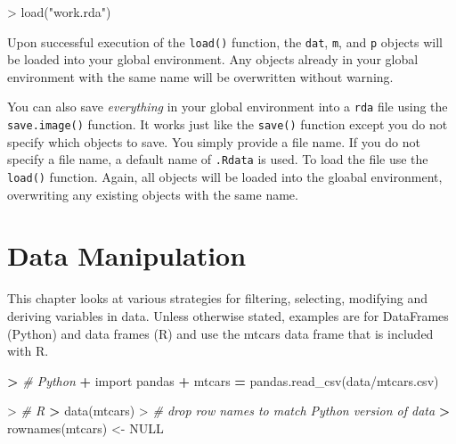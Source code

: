 \documentclass[
]{book}
\newenvironment{Shaded}{\begin{snugshade}}{\end{snugshade}}
\newcommand{\CommentTok}[1]{\textcolor[rgb]{0.56,0.35,0.01}{\textit{#1}}}
\newcommand{\ConstantTok}[1]{\textcolor[rgb]{0.00,0.00,0.00}{#1}}
\newcommand{\ErrorTok}[1]{\textcolor[rgb]{0.64,0.00,0.00}{\textbf{#1}}}
\newcommand{\FunctionTok}[1]{\textcolor[rgb]{0.00,0.00,0.00}{#1}}
\newcommand{\ImportTok}[1]{#1}
\newcommand{\NormalTok}[1]{#1}
\newcommand{\OperatorTok}[1]{\textcolor[rgb]{0.81,0.36,0.00}{\textbf{#1}}}
\newcommand{\OtherTok}[1]{\textcolor[rgb]{0.56,0.35,0.01}{#1}}
\newcommand{\SpecialCharTok}[1]{\textcolor[rgb]{0.00,0.00,0.00}{#1}}
\newcommand{\StringTok}[1]{\textcolor[rgb]{0.31,0.60,0.02}{#1}}
\begin{document}
\begin{Shaded}
\begin{Highlighting}[]
\SpecialCharTok{\textgreater{}} \FunctionTok{load}\NormalTok{(}\StringTok{"work.rda"}\NormalTok{)}
\end{Highlighting}
\end{Shaded}

Upon successful execution of the \texttt{load()} function, the \texttt{dat}, \texttt{m}, and \texttt{p} objects will be loaded into your global environment. Any objects already in your global environment with the same name will be overwritten without warning.

You can also save \emph{everything} in your global environment into a \texttt{rda} file using the \texttt{save.image()} function. It works just like the \texttt{save()} function except you do not specify which objects to save. You simply provide a file name. If you do not specify a file name, a default name of \texttt{.Rdata} is used. To load the file use the \texttt{load()} function. Again, all objects will be loaded into the gloabal environment, overwriting any existing objects with the same name.

\hypertarget{data-manipulation}{%
\chapter{Data Manipulation}\label{data-manipulation}}

This chapter looks at various strategies for filtering, selecting, modifying and deriving variables in data. Unless otherwise stated, examples are for DataFrames (Python) and data frames (R) and use the mtcars data frame that is included with R.

\begin{Shaded}
\begin{Highlighting}[]
\OperatorTok{\textgreater{}} \CommentTok{\# Python}
\OperatorTok{+} \ImportTok{import}\NormalTok{ pandas}
\OperatorTok{+}\NormalTok{ mtcars }\OperatorTok{=}\NormalTok{ pandas.read\_csv(}\StringTok{\textquotesingle{}data/mtcars.csv\textquotesingle{}}\NormalTok{)}
\end{Highlighting}
\end{Shaded}

\begin{Shaded}
\begin{Highlighting}[]
\SpecialCharTok{\textgreater{}} \CommentTok{\# R}
\ErrorTok{\textgreater{}} \FunctionTok{data}\NormalTok{(mtcars)}
\SpecialCharTok{\textgreater{}} \CommentTok{\# drop row names to match Python version of data}
\ErrorTok{\textgreater{}} \FunctionTok{rownames}\NormalTok{(mtcars) }\OtherTok{\textless{}{-}} \ConstantTok{NULL}
\end{Highlighting}
\end{Shaded}
\end{document}

